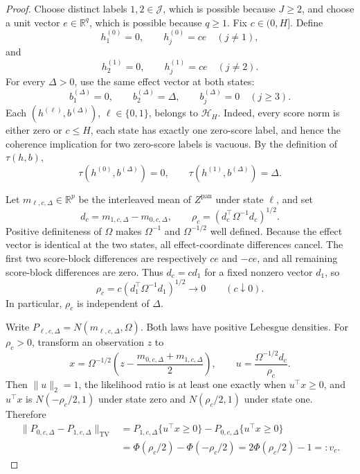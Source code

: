 \documentclass{article}
\begin{document}
\begin{proof}
Choose distinct labels \(1,2\in\mathcal J\), which is possible because \(J\geq2\), and choose a unit vector \(e\in\mathbb R^q\), which is possible because \(q\geq1\). Fix \(c\in(0,H]\). Define
\[
 h^{(0)}_1=0,\qquad h^{(0)}_j=ce\quad(j\ne1),
\]
and
\[
 h^{(1)}_2=0,\qquad h^{(1)}_j=ce\quad(j\ne2).
\]
For every \(\Delta>0\), use the same effect vector at both states:
\[
 b^{(\Delta)}_1=0,\qquad b^{(\Delta)}_2=\Delta,
 \qquad b^{(\Delta)}_j=0\quad(j\geq3).
\]
Each \((h^{(\ell)},b^{(\Delta)})\), \(\ell\in\{0,1\}\), belongs to \(\mathcal H_H\). Indeed, every score norm is either zero or \(c\leq H\), each state has exactly one zero-score label, and hence the coherence implication for two zero-score labels is vacuous. By the definition of \(\tau(h,b)\),
\[
 \tau(h^{(0)},b^{(\Delta)})=0,
 \qquad
 \tau(h^{(1)},b^{(\Delta)})=\Delta.
 \tag{1}
\]

Let \(m_{\ell,c,\Delta}\in\mathbb R^p\) be the interleaved mean of \(Z^{\mathrm{pan}}\) under state \(\ell\), and set
\[
 d_c=m_{1,c,\Delta}-m_{0,c,\Delta},
 \qquad
 \rho_c=(d_c^{\top}\Omega^{-1}d_c)^{1/2}.
 \tag{2}
\]
Positive definiteness of \(\Omega\) makes \(\Omega^{-1}\) and \(\Omega^{-1/2}\) well defined. Because the effect vector is identical at the two states, all effect-coordinate differences cancel. The first two score-block differences are respectively \(ce\) and \(-ce\), and all remaining score-block differences are zero. Thus \(d_c=cd_1\) for a fixed nonzero vector \(d_1\), so
\[
 \rho_c=c(d_1^{\top}\Omega^{-1}d_1)^{1/2}\longrightarrow0
 \qquad(c\downarrow0).
 \tag{3}
\]
In particular, \(\rho_c\) is independent of \(\Delta\).

Write \(P_{\ell,c,\Delta}=N(m_{\ell,c,\Delta},\Omega)\). Both laws have positive Lebesgue densities. For \(\rho_c>0\), transform an observation \(z\) to
\[
 x=\Omega^{-1/2}\left(z-\frac{m_{0,c,\Delta}+m_{1,c,\Delta}}2\right),
 \qquad
 u=\frac{\Omega^{-1/2}d_c}{\rho_c}.
\]
Then \(\lVert u\rVert_2=1\), the likelihood ratio is at least one exactly when \(u^{\top}x\geq0\), and \(u^{\top}x\) is \(N(-\rho_c/2,1)\) under state zero and \(N(\rho_c/2,1)\) under state one. Therefore
\[
\begin{aligned}
 \lVert P_{0,c,\Delta}-P_{1,c,\Delta}\rVert_{\mathrm{TV}}
 &=P_{1,c,\Delta}\{u^{\top}x\geq0\}
   -P_{0,c,\Delta}\{u^{\top}x\geq0\}\\
 &=\Phi(\rho_c/2)-\Phi(-\rho_c/2)
 =2\Phi(\rho_c/2)-1
 =:v_c.
\end{aligned}
\tag{4}
\]


\end{proof}
\end{document}
